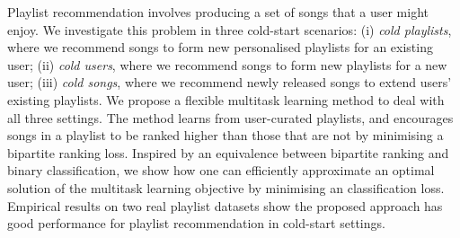 
Playlist recommendation involves producing a set of songs that a user might enjoy.
We investigate this problem in three %
cold-start scenarios:
(i) \emph{cold playlists}, 
where we recommend songs to form new personalised playlists for an existing user;
(ii) \emph{cold users},
where we recommend songs to form new playlists for a new user;
(iii) \emph{cold songs}, where we recommend newly released songs to extend users' existing playlists.
%
We propose a flexible multitask learning method to deal with all three settings.
The method learns from user-curated playlists,
and encourages songs in a playlist 
to be ranked higher than those that are not
by minimising a %
bipartite ranking loss.
Inspired by an equivalence between bipartite ranking and binary classification,
we show how one can efficiently approximate an optimal solution of the multitask learning objective by 
minimising an classification loss.
%
Empirical results on two real playlist datasets show the proposed approach has good performance 
for playlist recommendation in cold-start settings.
%
